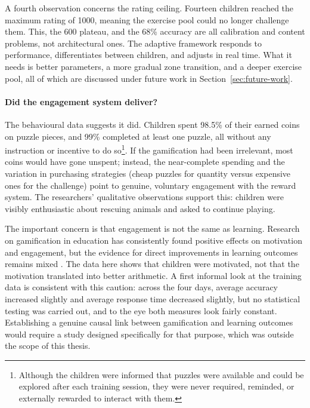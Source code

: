 A fourth observation concerns the rating ceiling. Fourteen children reached the maximum rating of 1000, meaning the exercise pool could no longer challenge them. This, the 600 plateau, and the 68\% accuracy are all calibration and content problems, not architectural ones. The adaptive framework responds to performance, differentiates between children, and adjusts in real time. What it needs is better parameters, a more gradual zone transition, and a deeper exercise pool, all of which are discussed under future work in Section~\ref{sec:future-work}.

\paragraph{Did the engagement system deliver?}
The behavioural data suggests it did. Children spent 98.5\% of their earned coins on puzzle pieces, and 99\% completed at least one puzzle, all without any instruction or incentive to do so\footnote{Although the children were informed that puzzles were available and could be explored after each training session, they were never required, reminded, or externally rewarded to interact with them.}. If the gamification had been irrelevant, most coins would have gone unspent; instead, the near-complete spending and the variation in purchasing strategies (cheap puzzles for quantity versus expensive ones for the challenge) point to genuine, voluntary engagement with the reward system. The researchers' qualitative observations support this: children were visibly enthusiastic about rescuing animals and asked to continue playing.

The important concern is that engagement is not the same as learning. Research on gamification in education has consistently found positive effects on motivation and engagement, but the evidence for direct improvements in learning outcomes remains mixed \cite{sailer2020gamification}. The data here shows that children were motivated, not that the motivation translated into better arithmetic. A first informal look at the training data is consistent with this caution: across the four days, average accuracy increased slightly and average response time decreased slightly, but no statistical testing was carried out, and to the eye both measures look fairly constant. Establishing a genuine causal link between gamification and learning outcomes would require a study designed specifically for that purpose, which was outside the scope of this thesis.

